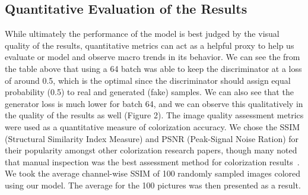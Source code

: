 \documentclass[10pt,twocolumn,letterpaper]{article}
\begin{document}
\subsection{Quantitative Evaluation of the Results}
While ultimately the performance of the model is best judged by the visual quality of the results, quantitative metrics can act as a helpful proxy to help us evaluate or model and observe macro trends in its behavior. We can see the from the table above that using a 64 batch was able to keep the discriminator at a loss of around 0.5, which is the optimal since the discriminator should assign equal probability (0.5) to real and generated (fake) samples. We can also see that the generator loss is much lower for batch 64, and we can observe this qualitatively in the quality of the results as well (Figure 2). The image quality assessment metrics were used as a quantitative measure of colorization accuracy. We chose the SSIM (Structural Similarity Index Measure) and PSNR (Peak-Signal Noise Ration) for their popularity amongst other colorization research papers, though many noted that manual inspection was the best assessment method for colorization results~\cite{Pix2Pix, Huang}.  We took the average channel-wise SSIM of 100 randomly sampled images colored using our model. The average for the 100 pictures was then presented as a result.
\end{document}
